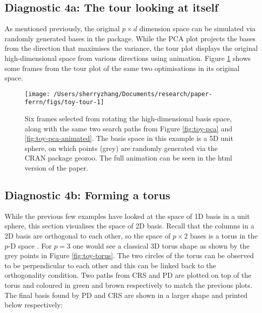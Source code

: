 \hypertarget{diagnostic-4a-the-tour-looking-at-itself}{%
\subsection{Diagnostic 4a: The tour looking at
itself}\label{diagnostic-4a-the-tour-looking-at-itself}}

As mentioned previously, the original \(p \times d\) dimension space can
be simulated via randomly generated bases in the 
\citep{geozoo} package. While the PCA plot projects the bases from the
direction that maximises the variance, the tour plot displays the
original high-dimensional space from various directions using animation.
Figure \ref{fig:toy-tour} shows some frames from the tour plot of the
same two optimisations in its original space.

\begin{Schunk}
\begin{figure}

{\centering \texttt{[image: /Users/sherryzhang/Documents/research/paper-ferrn/figs/toy-tour-1]} 

}

\caption{Six frames selected from rotating the high-dimensional basis space, along with the same two search paths from Figure \ref{fig:toy-pca} and \ref{fig:toy-pca-animated}. The basis space in this example is a 5D unit sphere, on which points (grey) are randomly generated via the CRAN package geozoo. The full animation can be seen in the html version of the paper.}\label{fig:toy-tour}
\end{figure}
\end{Schunk}

\hypertarget{diagnostic-4b-forming-a-torus}{%
\subsection{Diagnostic 4b: Forming a
torus}\label{diagnostic-4b-forming-a-torus}}

While the previous few examples have looked at the space of 1D basis in
a unit sphere, this section visualises the space of 2D basis. Recall
that the columns in a 2D basis are orthogonal to each other, so the
space of \(p \times 2\) bases is a torus in the \(p\)-D space
\citep{Buja1986-sw}. For \(p = 3\) one would see a classical 3D torus
shape as shown by the grey points in Figure \ref{fig:toy-torus}. The two
circles of the torus can be observed to be perpendicular to each other
and this can be linked back to the orthogonality condition. Two paths
from CRS and PD are plotted on top of the torus and coloured in green
and brown respectively to match the previous plots. The final basis
found by PD and CRS are shown in a larger shape and printed below
respectively:


